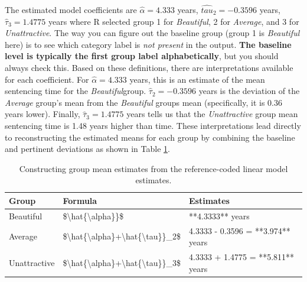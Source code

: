 \documentclass[]{book}
\begin{document}
The estimated model coefficients are \(\hat{\alpha} = 4.333\) years,
\(\hat{tau}_2 =-0.3596\) years, \(\hat{\tau}_3=1.4775\) years where R
selected group 1 for \emph{Beautiful}, 2 for \emph{Average}, and 3 for
\emph{Unattractive}. The way you can figure out the baseline group
(group 1 is \emph{Beautiful} here) is to see which category label is
\emph{not present} in the output. \textbf{The baseline level is
typically the first group label alphabetically}, but you should always
check this. Based on these definitions, there are interpretations
available for each coefficient. For \(\hat{\alpha} = 4.333\) years, this
is an estimate of the mean sentencing time for the
\emph{Beautiful}group. \(\hat{\tau}_2 =-0.3596\) years is the deviation
of the \emph{Average} group's mean from the \emph{Beautiful} groups mean
(specifically, it is \(0.36\) years lower). Finally,
\(\hat{\tau}_3=1.4775\) years tells us that the \emph{Unattractive}
group mean sentencing time is 1.48 years higher than time. These
interpretations lead directly to reconstructing the estimated means for
each group by combining the baseline and pertinent deviations as shown
in Table \ref{tab:Table3-1}.




\begin{table}

\caption{\label{tab:Table3-1}Constructing group mean estimates from the reference-coded
linear model estimates.}
\centering
\begin{tabular}[t]{l|l|l}
\hline
Group & Formula & Estimates\\
\hline
Beautiful & \$\textbackslash{}hat\{\textbackslash{}alpha\}\}\$ & **4.3333** years\\
\hline
Average & \$\textbackslash{}hat\{\textbackslash{}alpha\}+\textbackslash{}hat\{\textbackslash{}tau\}\}\_2\$ & 4.3333 - 0.3596 = **3.974** years\\
\hline
Unattractive & \$\textbackslash{}hat\{\textbackslash{}alpha\}+\textbackslash{}hat\{\textbackslash{}tau\}\}\_3\$ & 4.3333 + 1.4775 = **5.811** years\\
\hline
\end{tabular}
\end{table}
\end{document}
